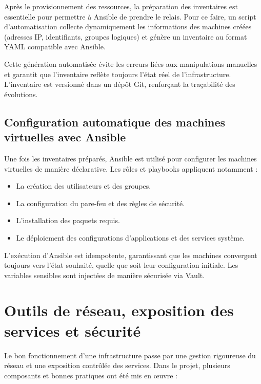 Après le provisionnement des ressources, la préparation des inventaires est essentielle pour permettre à Ansible de prendre le relais.
Pour ce faire, un script d'automatisation collecte dynamiquement les informations des machines créées (adresses IP, identifiants, groupes logiques) et génère un inventaire au format YAML compatible avec Ansible.

Cette génération automatisée évite les erreurs liées aux manipulations manuelles et garantit que l'inventaire reflète toujours l'état réel de l'infrastructure.
L'inventaire est versionné dans un dépôt Git, renforçant la traçabilité des évolutions.

\subsection{Configuration automatique des machines virtuelles avec Ansible}

Une fois les inventaires préparés, Ansible est utilisé pour configurer les machines virtuelles de manière déclarative.
Les rôles et playbooks appliquent notamment :
\begin{itemize}
	\item La création des utilisateurs et des groupes.
	\item La configuration du pare-feu et des règles de sécurité.
	\item L'installation des paquets requis.
	\item Le déploiement des configurations d’applications et des services système.
\end{itemize}

L'exécution d'Ansible est idempotente, garantissant que les machines convergent toujours vers l'état souhaité, quelle que soit leur configuration initiale.
Les variables sensibles sont injectées de manière sécurisée via Vault.

\section{Outils de réseau, exposition des services et sécurité}

Le bon fonctionnement d'une infrastructure passe par une gestion rigoureuse du réseau et une exposition contrôlée des services.
Dans le projet, plusieurs composants et bonnes pratiques ont été mis en œuvre :

